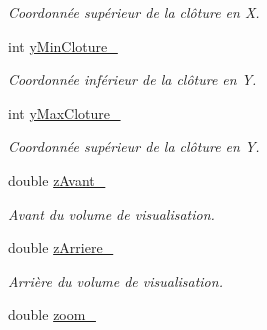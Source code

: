 \begin{DoxyCompactItemize}
\begin{DoxyCompactList}\small\item\em Coordonnée supérieur de la clôture en X. \end{DoxyCompactList}\item 
\hypertarget{classvue_1_1_projection_a347192bd39c5ba331e97061f797ed3f0}{int \hyperlink{classvue_1_1_projection_a347192bd39c5ba331e97061f797ed3f0}{y\-Min\-Cloture\-\_\-}}\label{classvue_1_1_projection_a347192bd39c5ba331e97061f797ed3f0}

\begin{DoxyCompactList}\small\item\em Coordonnée inférieur de la clôture en Y. \end{DoxyCompactList}\item 
\hypertarget{classvue_1_1_projection_a6f60c6c82b2c79d647fde24fbe67b23c}{int \hyperlink{classvue_1_1_projection_a6f60c6c82b2c79d647fde24fbe67b23c}{y\-Max\-Cloture\-\_\-}}\label{classvue_1_1_projection_a6f60c6c82b2c79d647fde24fbe67b23c}

\begin{DoxyCompactList}\small\item\em Coordonnée supérieur de la clôture en Y. \end{DoxyCompactList}\item 
\hypertarget{classvue_1_1_projection_a7decea4d1b5a891a9457f4ef00575e27}{double \hyperlink{classvue_1_1_projection_a7decea4d1b5a891a9457f4ef00575e27}{z\-Avant\-\_\-}}\label{classvue_1_1_projection_a7decea4d1b5a891a9457f4ef00575e27}

\begin{DoxyCompactList}\small\item\em Avant du volume de visualisation. \end{DoxyCompactList}\item 
\hypertarget{classvue_1_1_projection_a2f7cb7c480bee25fed5b85c1b0d20b14}{double \hyperlink{classvue_1_1_projection_a2f7cb7c480bee25fed5b85c1b0d20b14}{z\-Arriere\-\_\-}}\label{classvue_1_1_projection_a2f7cb7c480bee25fed5b85c1b0d20b14}

\begin{DoxyCompactList}\small\item\em Arrière du volume de visualisation. \end{DoxyCompactList}\item 
\hypertarget{classvue_1_1_projection_a7703ac7340fcbf6c13c16c2f3667b46b}{double \hyperlink{classvue_1_1_projection_a7703ac7340fcbf6c13c16c2f3667b46b}{zoom\-\_\-}}\label{classvue_1_1_projection_a7703ac7340fcbf6c13c16c2f3667b46b}


\end{DoxyCompactItemize}
